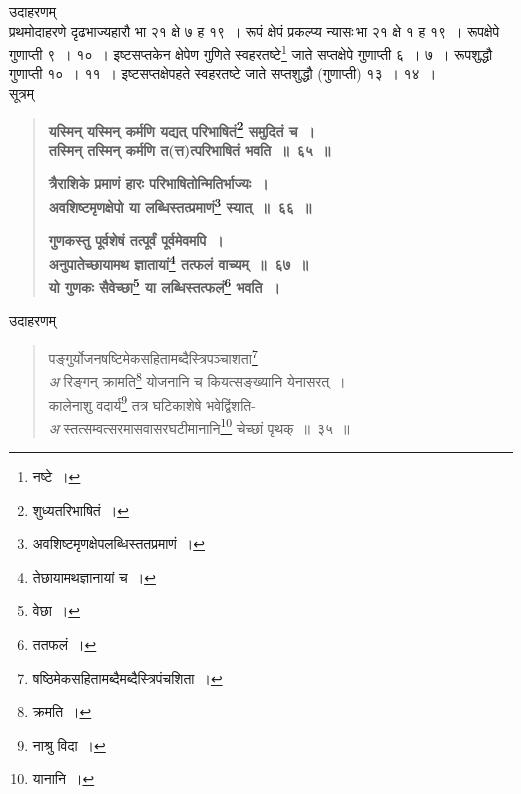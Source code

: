 \documentclass[11pt, openany]{book}
\begin{document}
\newpage

उदाहरणम् \textendash \\

प्रथमोदाहरणे दृढभाज्यहारौ भा २१ क्षे ७ ह १९~। रूपं क्षेपं प्रकल्प्य
न्यासः\textendash \,भा २१ क्षे १ ह १९~। रूपक्षेपे गुणाप्ती ९~। १०~। इष्टसप्तकेन क्षेपेण गुणिते स्वहरतष्टे\renewcommand{\thefootnote}{१}\footnote{नष्टे~।} जाते सप्तक्षेपे गुणाप्ती ६~। ७~। रूपशुद्धौ गुणाप्ती १०~। ११~। इष्टसप्तक्षेपहते स्वहरतष्टे जाते सप्तशुद्धौ (गुणाप्ती) १३~। १४~। \\

सूत्रम् \textendash 

\begin{quote}
\textbf{{\color{purple}यस्मिन् यस्मिन् कर्मणि यद्यत् परिभाषितं\renewcommand{\thefootnote}{२}\footnote{शुध्यतरिभाषितं~।} समुदितं च~। \\
तस्मिन् तस्मिन् कर्मणि त(त्त)त्परिभाषितं भवति~॥~६५~॥}}
\vspace{1mm}

\textbf{{\color{purple}त्रैराशिके प्रमाणं हारः परिभाषितोन्मितिर्भाज्यः~। \\
अवशिष्टमृणक्षेपो या लब्धिस्तत्प्रमाणं\renewcommand{\thefootnote}{३}\footnote{अवशिष्टमृणक्षेपलब्धिस्ततप्रमाणं~।} स्यात्~॥~६६~॥}}
\vspace{1mm}

\textbf{{\color{purple}गुणकस्तु पूर्वशेषं तत्पूर्वं पूर्वमेवमपि~। \\
अनुपातेच्छायामथ ज्ञातायां\renewcommand{\thefootnote}{४}\footnote{तेछायामथज्ञानायां च~।} तत्फलं वाच्यम्~॥~६७~॥\\
यो गुणकः सैवेच्छा\renewcommand{\thefootnote}{५}\footnote{वेछा~।} या लब्धिस्तत्फलं\renewcommand{\thefootnote}{६}\footnote{ततफलं~।} भवति~।}}
\end{quote}

उदाहरणम् \textendash 

\begin{quote}
{\color{red}पङ्गुर्योजनषष्टिमेकसहितामब्दैस्त्रिपञ्चाशता\renewcommand{\thefootnote}{७}\footnote{षष्ठिमेकसहितामब्दैमब्दैस्त्रिपंचशिता~।} \\
\emph{\color{white}अ} \hspace{2mm} रिङ्गन् क्रामति\renewcommand{\thefootnote}{८}\footnote{क्रमति~।} योजनानि च कियत्सङ्ख्यानि येनासरत्~। \\
कालेनाशु वदार्य\renewcommand{\thefootnote}{९}\footnote{नाश्रु विदा~।} तत्र घटिकाशेषे भवेद्विंशति- \\
\emph{\color{white}अ} \hspace{2mm} स्तत्सम्वत्सरमासवासरघटीमानानि\renewcommand{\thefootnote}{१०}\footnote{यानानि~।} चेच्छां पृथक्~॥~३५~॥}
\end{quote}
\end{document}
